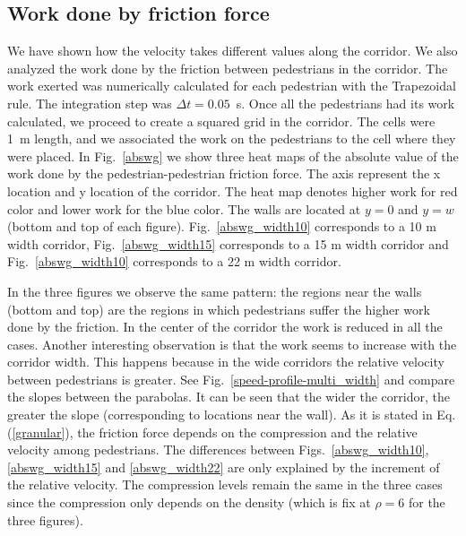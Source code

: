 \subsection{Work done by friction force}


We have shown how the velocity takes different values along the corridor. We also analyzed the work done by the friction between pedestrians in the corridor. The work exerted was numerically calculated for each pedestrian with the Trapezoidal rule. The integration step was $\Delta t = 0.05$~s. Once all the pedestrians had its work calculated, we proceed to create a squared grid in the corridor. The cells were 1~m length, and we associated the work on the pedestrians to the cell where they were placed.  In Fig.~\ref{abswg} we show three heat maps of the absolute value of the work done by the pedestrian-pedestrian friction force. The axis represent the x location and y location of the corridor. The heat map denotes higher work for red color and lower work for the blue color. The walls are located at $y=0$ and $y=w$ (bottom and top of each figure). Fig.~\ref{abswg_width10} corresponds to a 10 m width corridor, Fig.~\ref{abswg_width15} corresponds to a 15 m width corridor and  Fig.~\ref{abswg_width10} corresponds to a 22 m width corridor.

In the three figures we observe the same pattern: the regions near the walls (bottom and top) are the regions in which pedestrians suffer the higher work done by the friction. In the center of the corridor the work is reduced in all the cases. Another interesting observation is that the work seems to increase with the corridor width. This happens because in the wide corridors the relative velocity between pedestrians is greater. See Fig.~\ref{speed-profile-multi_width} and compare the slopes between the parabolas. It can be seen that the wider the corridor, the greater the slope (corresponding to locations near the wall). As it is stated in Eq.(\ref{granular}), the friction force depends on the compression and the relative velocity among pedestrians. The differences between Figs.~\ref{abswg_width10}, \ref{abswg_width15} and  \ref{abswg_width22}  are only explained by the increment of the relative velocity. The compression levels remain the same in the three cases since the compression only depends on the density (which is fix at $\rho=6$ for the three figures).



